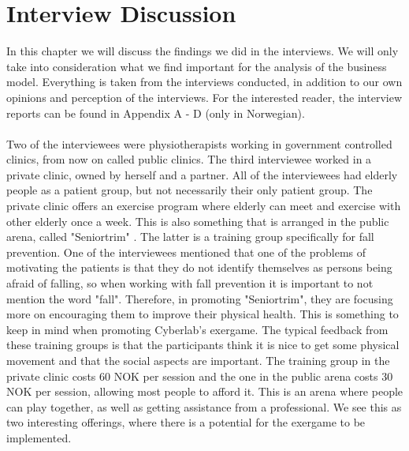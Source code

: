 \chapter{Interview Discussion}
In this chapter we will discuss the findings we did in the interviews. We will only take into consideration what we find important for the analysis of the business model. Everything is taken from the interviews conducted, in addition to our own opinions and perception of the interviews. For the interested reader, the interview reports can be found in Appendix A - D (only in Norwegian).\\ \\
Two of the interviewees were physiotherapists working in government controlled clinics, from now on called public clinics. The third interviewee worked in a private clinic, owned by herself and a partner. All of the interviewees had elderly people as a patient group, but not necessarily their only patient group. The private clinic offers an exercise program where elderly can meet and exercise with other elderly once a week. This is also something that is arranged in the public arena, called "Seniortrim" \cite{trim}. The latter is a training group specifically for fall prevention. One of the interviewees mentioned that one of the problems of motivating the patients is that they do not identify themselves as  persons being afraid of falling, so when working with fall prevention it is important to not mention the word "fall". Therefore, in promoting "Seniortrim", they are focusing more on encouraging them to improve their physical health. This is something to keep in mind when promoting Cyberlab's exergame. The typical feedback from these training groups is that the participants think it is nice to get some physical movement and that the social aspects are important. The training group in the private clinic costs 60 NOK per session and the one in the public arena costs 30 NOK per session, allowing most people to afford it. This is an arena where people can play together, as well as getting assistance from a professional. We see this as two interesting offerings, where there is a potential for the exergame to be implemented.  \\ \\
